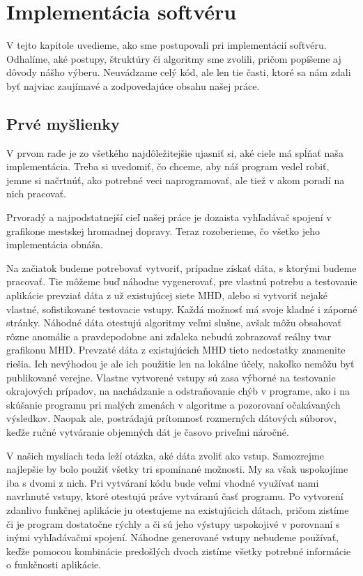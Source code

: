 \chapter[Implementácia]{Implementácia softvéru}
\label{kap:implementacia}

V tejto kapitole uvedieme, ako sme postupovali pri implementácií softvéru. Odhalíme, aké postupy, štruktúry či algoritmy sme zvolili, pričom popíšeme aj dôvody nášho výberu. Neuvádzame celý kód, ale len tie časti, ktoré sa nám zdali byť najviac zaujímavé a zodpovedajúce obsahu našej práce.\newline


\section{Prvé myšlienky}

V prvom rade je zo všetkého najdôležitejšie ujasniť si, aké ciele má spĺňať naša implementácia. Treba si uvedomiť, čo chceme, aby náš program vedel robiť, jemne si načrtnúť, ako potrebné veci naprogramovať, ale tiež v akom poradí na nich pracovať.\newline

Prvoradý a najpodstatnejší cieľ našej práce je dozaista vyhľadávač spojení v grafikone mestskej hromadnej dopravy. Teraz rozoberieme, čo všetko jeho implementácia obnáša.\newline

Na začiatok budeme potrebovať vytvoriť, prípadne získať dáta, s ktorými budeme pracovať. Tie môžeme buď náhodne vygenerovať, pre vlastnú potrebu a testovanie aplikácie prevziať dáta z už existujúcej siete MHD, alebo si vytvoriť nejaké vlastné, sofistikované testovacie vstupy. Každá možnosť má svoje kladné i záporné stránky. Náhodné dáta otestujú algoritmy veľmi slušne, avšak môžu obsahovať rôzne anomálie a pravdepodobne ani zďaleka nebudú zobrazovať reálny tvar grafikonu MHD. Prevzaté dáta z existujúcich MHD tieto nedostatky znamenite riešia. Ich nevýhodou je ale ich použitie len na lokálne účely, nakoľko nemôžu byť publikované verejne. Vlastne vytvorené vstupy sú zasa výborné na testovanie okrajových prípadov, na nachádzanie a odstraňovanie chýb v programe, ako i na skúšanie programu pri malých zmenách v algoritme a pozorovaní očakávaných výsledkov. Naopak ale, postrádajú prítomnosť rozmerných dátových súborov, keďže ručné vytváranie objemných dát je časovo priveľmi náročné.\newline

V našich mysliach teda leží otázka, aké dáta zvoliť ako vstup. Samozrejme najlepšie by bolo použiť všetky tri spomínané možnosti. My sa však uspokojíme iba s dvomi z nich. Pri vytváraní kódu bude veľmi vhodné využívať nami navrhnuté vstupy, ktoré otestujú práve vytváranú časť programu. Po vytvorení zdanlivo funkčnej aplikácie ju otestujeme na existujúcich dátach, pričom zistíme či je program dostatočne rýchly a či sú jeho výstupy uspokojivé v porovnaní s inými vyhľadávačmi spojení. Náhodne generované vstupy nebudeme používať, keďže pomocou kombinácie predošlých dvoch zistíme všetky potrebné informácie o funkčnosti aplikácie.\newline

